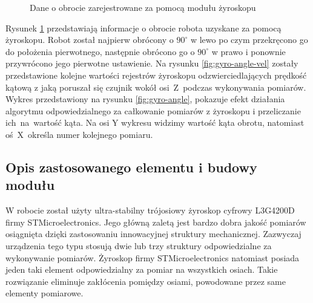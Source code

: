  \begin{figure}[h!]
 \centering
 \caption{Dane o obrocie zarejestrowane za pomocą modułu żyroskopu}
 \label{fig:gyro-angle-plot}
\end{figure}

Rysunek \ref{fig:gyro-angle-plot} przedstawiają informacje o obrocie robota uzyskane za pomocą
żyroskopu. Robot został najpierw obrócony o $90^{\circ}$ w lewo po czym
przekręcono go do położenia pierwotnego, następnie obrócono go o $90^{\circ}$ w prawo i
ponownie przywrócono jego pierwotne ustawienie. Na rysunku \ref{fig:gyro-angle-vel} zostały
przedstawione kolejne wartości rejestrów żyroskopu odzwierciedlających prędkość
kątową z jaką poruszał się czujnik wokół osi~Z~podczas wykonywania pomiarów.
Wykres przedstawiony na rysunku \ref{fig:gyro-angle}, pokazuje efekt działania
algorytmu odpowiedzialnego za całkowanie pomiarów z żyroskopu i przeliczanie ich~na~wartość
kąta. Na osi Y wykresu widzimy wartość kąta obrotu, natomiast oś~X~określa
numer kolejnego pomiaru.

\subsection{Opis zastosowanego elementu i budowy modułu}
W robocie został użyty ultra-stabilny trójosiowy żyroskop cyfrowy L3G4200D firmy
STMicroelectronics. Jego główną zaletą jest bardzo dobra jakość pomiarów
osiągnięta dzięki zastosowaniu innowacyjnej struktury mechanicznej. Zazwyczaj
urządzenia tego typu stosują dwie lub trzy struktury odpowiedzialne za
wykonywanie pomiarów. Żyroskop firmy STMicroelectronics natomiast posiada jeden
taki element odpowiedzialny za pomiar na wszystkich osiach. Takie rozwiązanie
eliminuje zakłócenia pomiędzy osiami, powodowane przez same elementy pomiarowe.

